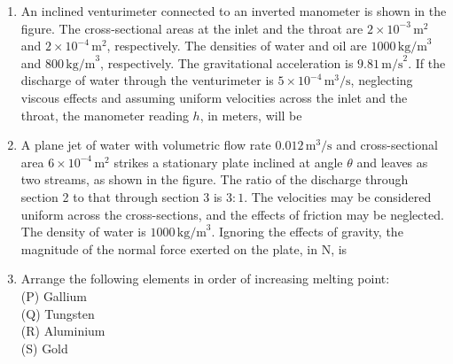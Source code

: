 \documentclass[article]{IEEEtran}
\numberwithin{figure}{enumi}
\begin{document}
\begin{enumerate}
\item An inclined venturimeter connected to an inverted manometer is shown in the figure. The cross-sectional areas at the inlet and the throat are $2 \times 10^{-3} \, \text{m}^2$ and $2 \times 10^{-4} \, \text{m}^2$, respectively. The densities of water and oil are $1000 \, \text{kg/m}^3$ and $800 \, \text{kg/m}^3$, respectively. The gravitational acceleration is $9.81 \, \text{m/s}^2$. If the discharge of water through the venturimeter is $5 \times 10^{-4} \, \text{m}^3/\text{s}$, neglecting viscous effects and assuming uniform velocities across the inlet and the throat, the manometer reading $h$, in meters, will be \underline{\hspace{2cm}}

\item A plane jet of water with volumetric flow rate $0.012 \, \text{m}^3/\text{s}$ and cross-sectional area $6 \times 10^{-4} \, \text{m}^2$ strikes a stationary plate inclined at angle $\theta$ and leaves as two streams, as shown in the figure. The ratio of the discharge through section 2 to that through section 3 is $3:1$. The velocities may be considered uniform across the cross-sections, and the effects of friction may be neglected. The density of water is $1000 \, \text{kg/m}^3$. Ignoring the effects of gravity, the magnitude of the normal force exerted on the plate, in N, is


\item Arrange the following elements in order of increasing melting point:\\
(P) Gallium\\
(Q) Tungsten\\
(R) Aluminium\\
(S) Gold


\end{enumerate}
\end{document}
